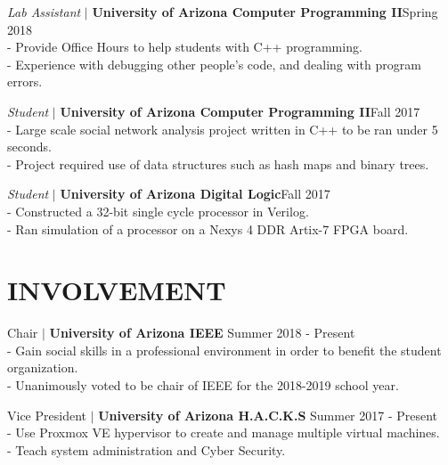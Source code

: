 \documentclass[line, 12pt]{res}
\newcommand\tab[1][0.5cm]{\hspace*{#1}}
\begin{document}
\begin{resume}
                {\sl Lab Assistant} $\mid$ \textbf{University of Arizona Computer Programming II}\hfill Spring 2018 \\
                 	\tab - Provide Office Hours to help students with C++ programming. \\
                 	\tab - Experience with debugging other people’s code, and dealing with program errors.


				{\sl Student} $\mid$ \textbf{University of Arizona Computer Programming II}\hfill Fall 2017 \\
						\tab - Large scale social network analysis project written in C++ to be ran under 5 seconds. \\
						\tab - Project required use of data structures such as hash maps and binary trees.

				{\sl Student} $\mid$ \textbf{University of Arizona Digital Logic}\hfill Fall 2017 \\
						\tab - Constructed a 32-bit single cycle processor in Verilog. \\
						\tab - Ran simulation of a processor on a Nexys 4 DDR Artix-7 FPGA board.

\section{INVOLVEMENT} 
	Chair $\mid$ \textbf{University of Arizona IEEE} \hfill Summer 2018 - Present \\
		\tab - Gain social skills in a professional environment in order to benefit the student organization. \\
		\tab - Unanimously voted to be chair of IEEE for the 2018-2019 school year.
	
	Vice President $\mid$ \textbf{University of Arizona H.A.C.K.S} \hfill Summer 2017 - Present \\
		\tab - Use Proxmox VE hypervisor to create and manage multiple virtual machines. \\
		\tab - Teach system administration and Cyber Security.
	

\end{resume}
\end{document}
